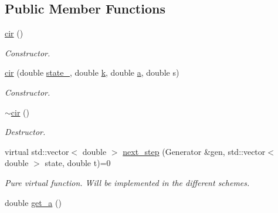 \subsection*{Public Member Functions}
\begin{DoxyCompactItemize}
\item 
\mbox{\label{classcir_af9a7a658975ddd029b12cd795ac04443}} 
\mbox{\hyperlink{classcir_af9a7a658975ddd029b12cd795ac04443}{cir}} ()
\begin{DoxyCompactList}\small\item\em Constructor. \end{DoxyCompactList}\item 
\mbox{\label{classcir_adbb40f0d8743587d1ed5d2bb5728e315}} 
\mbox{\hyperlink{classcir_adbb40f0d8743587d1ed5d2bb5728e315}{cir}} (double \mbox{\hyperlink{classprocess_ab4d01c8ea2e9c8285134786d32ae42aa}{state\+\_}}, double \mbox{\hyperlink{classcir_aa5b05ff03ee8bb587ea94426a9ce704b}{k}}, double \mbox{\hyperlink{classcir_a358578305ea60d31c00546233304651c}{a}}, double s)
\begin{DoxyCompactList}\small\item\em Constructor. \end{DoxyCompactList}\item 
\mbox{\label{classcir_a6b904f45a8f19eed507d814fbc09776f}} 
\mbox{\hyperlink{classcir_a6b904f45a8f19eed507d814fbc09776f}{$\sim$cir}} ()
\begin{DoxyCompactList}\small\item\em Destructor. \end{DoxyCompactList}\item 
\mbox{\label{classcir_ad3d4f7db1a4448632a6fdbada17cc651}} 
virtual std\+::vector$<$ double $>$ \mbox{\hyperlink{classcir_ad3d4f7db1a4448632a6fdbada17cc651}{next\+\_\+step}} (Generator \&gen, std\+::vector$<$ double $>$ state, double t)=0
\begin{DoxyCompactList}\small\item\em Pure virtual function. Will be implemented in the different schemes. \end{DoxyCompactList}\item 
\mbox{\label{classcir_a99e9faea04b897570b376e4495cdea53}} 
double \mbox{\hyperlink{classcir_a99e9faea04b897570b376e4495cdea53}{get\+\_\+a}} ()

\end{DoxyCompactItemize}
